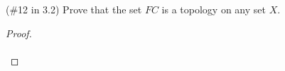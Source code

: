 (\#12 in 3.2) Prove that the set $FC$ is a topology on any set $X$.

\begin{proof}\renewcommand{\qedsymbol}{}\ \\\\
\end{proof}